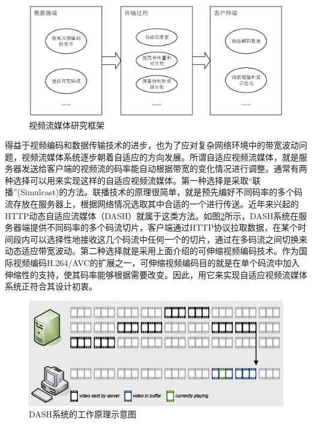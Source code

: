 \begin{figure}[h]
	\centering
	\includegraphics[width = 0.9\linewidth]{eps/research-framework}
	\caption{视频流媒体研究框架 \label{fig:research-framework}}
\end{figure}

得益于视频编码和数据传输技术的进步，也为了应对复杂网络环境中的带宽波动问题，视频流媒体系统逐步朝着自适应的方向发展。所谓自适应视频流媒体，就是服务器发送给客户端的视频流的码率能自动根据带宽的变化情况进行调整。通常有两种选择可以用来实现这样的自适应视频流媒体。第一种选择是采取“联播”(Simulcast)的方法。联播技术的原理很简单，就是预先编好不同码率的多个码流存放在服务器上，根据网络情况选取其中合适的一个进行传送。近年来兴起的HTTP动态自适应流媒体（DASH）\supercite{Sodagar2011}就属于这类方法。如图\ref{fig:12}所示，DASH系统在服务器端提供不同码率的多个码流切片，客户端通过HTTP协议拉取数据，在某个时间段内可以选择性地接收这几个码流中任何一个的切片，通过在多码流之间切换来动态适应带宽波动。第二种选择就是采用上面介绍的可伸缩视频编码技术。作为国际视频编码H.264/AVC的扩展之一，可伸缩视频编码目的就是在单个码流中加入伸缩性的支持，使其码率能够根据需要改变。因此，用它来实现自适应视频流媒体系统正符合其设计初衷。

\begin{figure}[h]
	\centering
	\includegraphics[width = 0.9\linewidth]{clip/12.png}
	\caption{DASH系统的工作原理示意图\label{fig:12}}
\end{figure}

